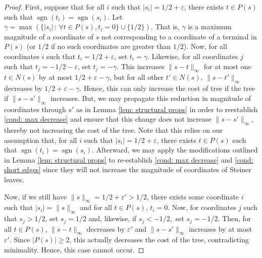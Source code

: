 \documentclass{theoretics}
\DeclareMathOperator{\sgn}{sgn}
\newcommand{\1}{\textbf{1}}
\begin{document}
\begin{proof}
First, suppose that for all $i$ such that $|s_i| = 1/2 + \varepsilon$, there exists $t \in P(s)$ such that $\sgn(t_i) = \sgn(s_i)$. Let $\gamma = \max(\{|s_i| \,:\, \forall t \in P(s), t_i = 0\} \cup \{ 1/2\}).$ That is, $\gamma$ is a maximum magnitude of a coordinate of $s$ not corresponding to a coordinate of a terminal in $P(s)$ (or $1/2$ if no such coordinates are greater than $1/2$). Now, for all coordinates $i$ such that $t_i = 1/2 + \varepsilon$, set $t_i = \gamma$. Likewise, for all coordinates $j$ such that $t_j = - 1/2 - \varepsilon$, set $t_j = -\gamma$. This increases $\| s - t\|_{\infty}$ for at most one $t \in N(s)$ by at most $1/2 + \varepsilon - \gamma$, but for all other $t' \in N(s)$, $\| s - t'\|_{\infty}$ decreases by $1/2 + \varepsilon - \gamma$. 
Hence, this can only increase the cost of tree if the tree if $\|s - s'\|_{\infty}$ increases. But, we may propagate this reduction in magnitude of coordinates through $s'$ as in Lemma \ref{lem: structural props} in order to reestablish \ref{cond: max decrease} and ensure that this change does not increase $\|s - s'\|_{\infty}$, thereby not increasing the cost of the tree. Note that this relies on our assumption that, for all $i$ such that $|s_i| = 1/2 + \varepsilon$, there exists $t \in P(s)$ such that $\sgn(t_i) = \sgn(s_i)$. Afterward, we may apply the modifications outlined in Lemma \ref{lem: structural props} to re-establish \ref{cond: max decrease} and \ref{cond: short edges} since they will not increase the magnitude of coordinates of Steiner leaves.


Now, if we still have  $\|s\|_{\infty} = 1/2 + \varepsilon' > 1/2$, there exists some coordinate $i$ such that $|s_i| = \|s\|_{\infty}$ and for all $t \in P(s)$, $t_i = 0$. Now, for coordinates $j$ such that $s_j > 1/2$, set $s_j = 1/2$ and, likewise, if $s_j < -1/2,$ set $s_j = -1/2$. Then, for all $t \in P(s)$, $\|s - t\|_{\infty}$ decreases by $\varepsilon'$ and $\|s - s'\|_{\infty}$ increases by at most $\varepsilon'$. Since $|P(s)| \geq 2$, this actually decreases the cost of the tree, contradicting minimality. Hence, this case cannot occur.





\end{proof}
\end{document}
